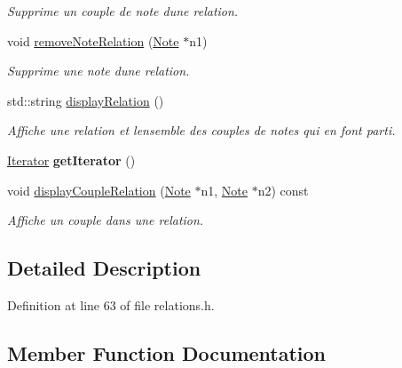 \begin{DoxyCompactItemize}
\begin{DoxyCompactList}\small\item\em Supprime un couple de note d\textquotesingle{}une relation. \end{DoxyCompactList}\item 
void \hyperlink{class_relation_a8f25fe0ab5bf722eb08d2dd31e99c7f4}{remove\+Note\+Relation} (\hyperlink{class_note}{Note} $\ast$n1)
\begin{DoxyCompactList}\small\item\em Supprime une note d\textquotesingle{}une relation. \end{DoxyCompactList}\item 
\mbox{\label{class_relation_a0b8a359787fe32c991710039fd081f97}} 
std\+::string \hyperlink{class_relation_a0b8a359787fe32c991710039fd081f97}{display\+Relation} ()
\begin{DoxyCompactList}\small\item\em Affiche une relation et l\textquotesingle{}ensemble des couples de notes qui en font parti. \end{DoxyCompactList}\item 
\mbox{\label{class_relation_ae30f6b7351f9ff6b3ed74422738a6ea2}} 
\hyperlink{class_relation_1_1_iterator}{Iterator} {\bfseries get\+Iterator} ()
\item 
void \hyperlink{class_relation_aa6974a453611dee90f2ca2da9fe30de6}{display\+Couple\+Relation} (\hyperlink{class_note}{Note} $\ast$n1, \hyperlink{class_note}{Note} $\ast$n2) const
\begin{DoxyCompactList}\small\item\em Affiche un couple dans une relation. \end{DoxyCompactList}\end{DoxyCompactItemize}


\subsection{Detailed Description}


Definition at line 63 of file relations.\+h.



\subsection{Member Function Documentation}
\mbox{\label{class_relation_aa6974a453611dee90f2ca2da9fe30de6}} 
